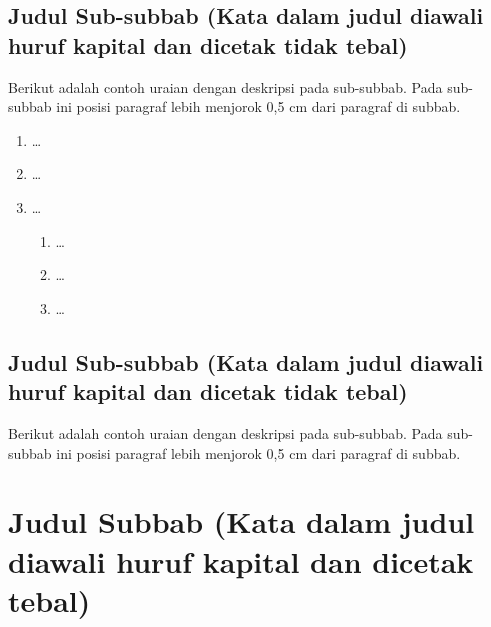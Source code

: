 \subsection{Judul Sub-subbab (Kata dalam judul diawali huruf kapital dan dicetak tidak tebal)}

\begin{ipbsubsubcontent}
Berikut adalah contoh uraian dengan deskripsi pada sub-subbab. Pada sub-subbab
ini posisi paragraf lebih menjorok 0,5 cm dari paragraf di subbab. \dotfill

\noindent\dotfill

\noindent\dotfill

\noindent\dotfill

\begin{enumerate}[label=\alph*),leftmargin=0.75cm,labelwidth=0.5cm,
  labelsep=0.25cm,align=left,itemsep=0pt,parsep=0pt,topsep=0pt,partopsep=0pt]
  \item \ldots
  \item \ldots
  \item \ldots
  \begin{enumerate}[label=(\arabic*),leftmargin=0.75cm,labelwidth=0.5cm,
    labelsep=0.25cm,align=left,itemsep=0pt,parsep=0pt,topsep=0pt,partopsep=0pt]
    \item \ldots
    \item \ldots
    \item \ldots
  \end{enumerate}
\end{enumerate}
\end{ipbsubsubcontent}

\subsection{Judul Sub-subbab (Kata dalam judul diawali huruf kapital dan dicetak tidak tebal)}

\begin{ipbsubsubcontent}
Berikut adalah contoh uraian dengan deskripsi pada sub-subbab. Pada sub-subbab
ini posisi paragraf lebih menjorok 0,5 cm dari paragraf di subbab. \dotfill

\noindent\dotfill
\end{ipbsubsubcontent}

\section[Judul Subbab]{Judul Subbab (Kata dalam judul diawali huruf kapital dan dicetak tebal)}

